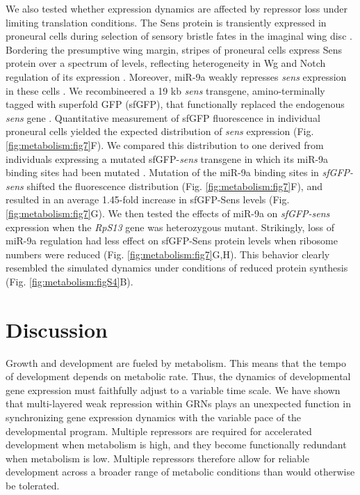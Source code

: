 We also tested whether expression dynamics are affected by repressor loss under limiting translation conditions. The Sens protein is transiently expressed in proneural cells during selection of sensory bristle fates in the imaginal wing disc \cite{Nolo2000}. Bordering the presumptive wing margin, stripes of proneural cells express Sens protein over a spectrum of levels, reflecting heterogeneity in Wg and Notch regulation of its expression \cite{JafarNejad2006,Quan2005}. Moreover, miR-9a weakly represses \textit{sens} expression in these cells \cite{Li2006}. We recombineered a 19 kb \textit{sens} transgene, amino-terminally tagged with superfold GFP (sfGFP), that functionally replaced the endogenous \textit{sens} gene \cite{Cassidy2013,Venken2006}. Quantitative measurement of sfGFP fluorescence in individual proneural cells yielded the expected distribution of \textit{sens} expression (Fig. \ref{fig:metabolism:fig7}F). We compared this distribution to one derived from individuals expressing a mutated sfGFP-\textit{sens} transgene in which its miR-9a binding sites had been mutated \cite{Cassidy2013}. Mutation of the miR-9a binding sites in \textit{sfGFP-sens} shifted the fluorescence distribution (Fig. \ref{fig:metabolism:fig7}F), and resulted in an average 1.45-fold increase in sfGFP-Sens levels (Fig. \ref{fig:metabolism:fig7}G). We then tested the effects of miR-9a on \textit{sfGFP-sens} expression when the \textit{RpS13} gene was heterozygous mutant. Strikingly, loss of miR-9a regulation had less effect on sfGFP-Sens protein levels when ribosome numbers were reduced (Fig. \ref{fig:metabolism:fig7}G,H). This behavior clearly resembled the simulated dynamics under conditions of reduced protein synthesis (Fig. \ref{fig:metabolism:figS4}B).

\section{Discussion}

Growth and development are fueled by metabolism. This means that the tempo of development depends on metabolic rate. Thus, the dynamics of developmental gene expression must faithfully adjust to a variable time scale. We have shown that multi-layered weak repression within GRNs plays an unexpected function in synchronizing gene expression dynamics with the variable pace of the developmental program. Multiple repressors are required for accelerated development when metabolism is high, and they become functionally redundant when metabolism is low. Multiple repressors therefore allow for reliable development across a broader range of metabolic conditions than would otherwise be tolerated.


